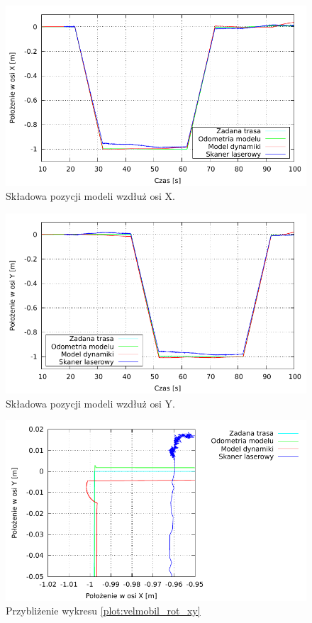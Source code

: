 		\begin{figure}[H]
			\centering
			\includegraphics[width=\textwidth]{plots/velmobil_rot_xt.pdf}
				\caption{Składowa pozycji modeli wzdłuż osi X.}
			\label{plot:velmobil_rot_xt}
		\end{figure}
		
		\begin{figure}[H]
			\centering
			\includegraphics[width=\textwidth]{plots/velmobil_rot_yt.pdf}
				\caption{Składowa pozycji modeli wzdłuż osi Y.}
			\label{plot:velmobil_rot_yt}
		\end{figure}
		
		\begin{figure}[H]
			\centering
			\includegraphics[width=\textwidth]{plots/velmobil_rot_xy_s.pdf}
				\caption{Przybliżenie wykresu \ref{plot:velmobil_rot_xy}}
			\label{plot:velmobil_rot_xy_s}
		\end{figure}
	
